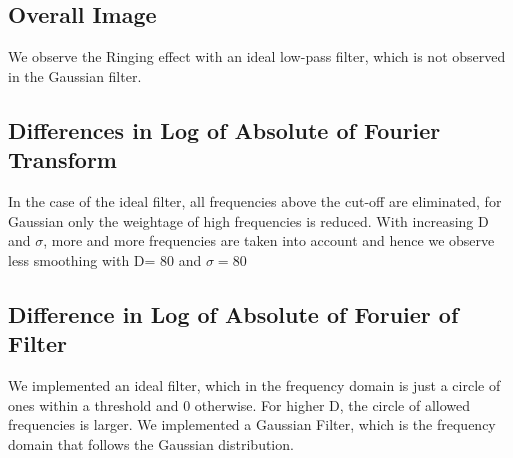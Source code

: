 \documentclass[a4paper]{article}
\begin{document}
\subsection{Overall Image}
We observe the Ringing effect with an ideal low-pass filter, which is not observed in the Gaussian filter.
\subsection{Differences in Log of Absolute of  Fourier Transform}
In the case of the ideal filter, all frequencies above the cut-off are eliminated, for Gaussian only the weightage of high frequencies is reduced. With increasing D and $\sigma$, more and more frequencies are taken into account and hence we observe less smoothing with D= 80 and $\sigma = 80$ 
\subsection{Difference in Log of Absolute of Foruier of Filter}
We implemented an ideal filter, which in the frequency domain is just a circle of ones within a threshold and 0 otherwise. For higher D, the circle of allowed frequencies is larger.
We implemented a Gaussian Filter, which is the frequency domain that follows the Gaussian distribution.












    
\end{document}
